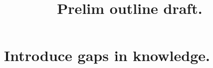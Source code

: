 \documentclass[english]{revtex4-1}
\begin{document}
\title{Prelim outline draft.}


\section{Introduce gaps in knowledge.}

\begin{comment}
\begin{enumerate}
    \item Introduce Density Functional theory.
    
    \begin{itemize}
        \item Introduce the many-particle Schrodinger equation.
        
        \item Difficulties in solving the many-particle Schrodinger equation for realistic solids necessitates approximations.
        
        \item Introduce the Born-Oppenheimer approximation as one of the simplifications to solving the many-particle Schrodinger equation.
        
        \item Introduce Kohn-Sham methods as computationally more tractable means of solving the many-electron Schrodinger equation. 
    \end{itemize}
    \end{enumerate}
\end{comment}
\end{document}
